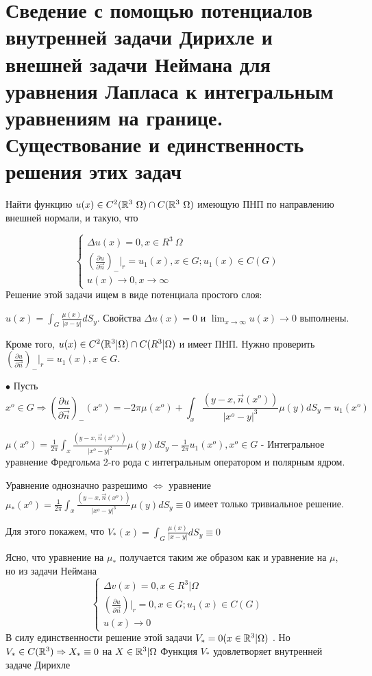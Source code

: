 \section{Сведение с помощью потенциалов внутренней задачи Дирихле и внешней задачи Неймана для уравнения Лапласа к интегральным уравнениям на границе. Существование и единственность решения этих задач}


Найти функцию $u(x) \in C^2(\mathbb{R}^3 \ \Omega) \cap C(\mathbb{R}^3 \ \Omega)$ имеющую ПНП по направлению внешней нормали, и такую, что 

\begin{equation}
 \begin{cases}
 \Delta u(x) = 0, x \in R^3 \ \Omega
  \\
   (\frac{\partial u}{\partial \vec{n}})_{-}|_r = u_1(x), x \in G; u_1(x) \in C(G)
   \\
   u(x) \to 0, x \to \infty
 \end{cases}
\end{equation}
Решение этой задачи ищем в виде потенциала простого слоя: 

$u(x) = \int_G \frac{\mu(x)}{|x - y|} dS_y$. Свойства $\Delta u(x) = 0$ и $\lim_{x \to \infty} u(x) \to 0$ выполнены.

Кроме того, $u(x) \in C^2(\mathbb{R}^3 | \Omega) \cap C(R^3 | \Omega)$ и имеет ПНП. Нужно проверить $(\frac{\partial u}{\partial \vec{n}})_-|_r = u_1(x), x \in G$. 

$\bullet$ Пусть $$x^o \in G \Rightarrow (\frac{\partial u}{\partial \vec{n}})_{-}(x^o) = -2\pi \mu(x^o) + \int_x \frac{(y - x, \vec{n}(x^o))}{|x^o - y|^3}\mu(y)dS_y = u_1(x^o)$$

$\mu(x^o) = \frac{1}{2\pi}\int_x \frac{(y - x, \vec{n}(x^o))}{|x^o - y|^2}\mu(y)dS_y - \frac{1}{2\pi}u_1(x^o), x^o \in G $ - Интегральное уравнение Фредгольма 2-го рода с интегральным оператором и полярным ядром.

Уравнение однозначно разрешимо $\Leftrightarrow$ уравнение $\mu_*(x^o) = \frac{1}{2\pi}\int_x \frac{(y - x, \vec{n}(x^o))}{|x^o - y|^3}\mu(y)dS_y \equiv 0 $ имеет только тривиальное решение. 

Для этого покажем, что $V_*(x) = \int_G \frac{\mu(x)}{|x - y|}dS_y \equiv 0$

Ясно, что уравнение на $\mu_*$ получается таким же образом как и уравнение на $\mu$, но из задачи Неймана 
\begin{equation}
 \begin{cases}
 \Delta v(x) = 0, x \in R^3 | \Omega
  \\
   (\frac{\partial u}{\partial \vec{n}})|_r = 0, x \in G; u_1(x) \in C(G)
   \\
   u(x) \to 0
 \end{cases}
\end{equation}
В силу единственности решение этой задачи $V_* = 0 (x \in \mathbb{R}^3 | \Omega)$ . Но $V_* \in C(\mathbb{R}^3) \Rightarrow X_* \equiv 0$ на $X \in \mathbb{R}^3 | \Omega$ Функция $V_*$ удовлетворяет внутренней задаче Дирихле

